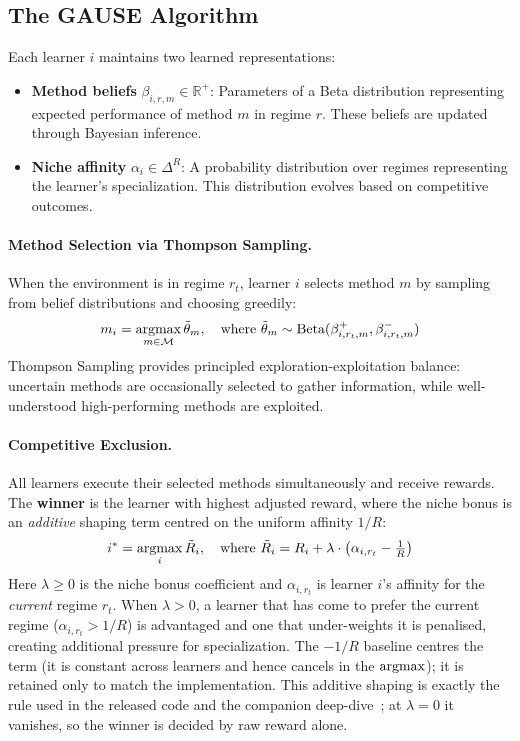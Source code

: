 \documentclass{article}
\newcommand{\R}{\mathbb{R}}
\newcommand{\argmax}{\operatornamewithlimits{argmax}}
\begin{document}
\subsection{The GAUSE Algorithm}

Each learner $i$ maintains two learned representations:
\begin{itemize}
    \item \textbf{Method beliefs} $\beta_{i,r,m} \in \R^+$: Parameters of a Beta distribution representing expected performance of method $m$ in regime $r$. These beliefs are updated through Bayesian inference.
    \item \textbf{Niche affinity} $\alpha_i \in \Delta^R$: A probability distribution over regimes representing the learner's specialization. This distribution evolves based on competitive outcomes.
\end{itemize}

\paragraph{Method Selection via Thompson Sampling.} When the environment is in regime $r_t$, learner $i$ selects method $m$ by sampling from belief distributions and choosing greedily:
\begin{equation}
    m_i = \argmax_{m \in \mathcal{M}} \tilde{\theta}_m, \quad \text{where } \tilde{\theta}_m \sim \text{Beta}(\beta_{i,r_t,m}^+, \beta_{i,r_t,m}^-)
\end{equation}
Thompson Sampling provides principled exploration-exploitation balance: uncertain methods are occasionally selected to gather information, while well-understood high-performing methods are exploited.

\paragraph{Competitive Exclusion.} All learners execute their selected methods simultaneously and receive rewards. The \textbf{winner} is the learner with highest adjusted reward, where the niche bonus is an \emph{additive} shaping term centred on the uniform affinity $1/R$:
\begin{equation}
\label{eq:niche_bonus}
    i^* = \argmax_i \tilde{R}_i, \quad \text{where } \tilde{R}_i = R_i + \lambda \cdot \left(\alpha_{i,r_t} - \tfrac{1}{R}\right)
\end{equation}
Here $\lambda \geq 0$ is the niche bonus coefficient and $\alpha_{i,r_t}$ is learner $i$'s affinity for the \emph{current} regime $r_t$. When $\lambda > 0$, a learner that has come to prefer the current regime ($\alpha_{i,r_t} > 1/R$) is advantaged and one that under-weights it is penalised, creating additional pressure for specialization. The $-1/R$ baseline centres the term (it is constant across learners and hence cancels in the $\argmax$); it is retained only to match the implementation. This additive shaping is exactly the rule used in the released code and the companion deep-dive~\cite{li2026emergent}; at $\lambda = 0$ it vanishes, so the winner is decided by raw reward alone.
\end{document}
